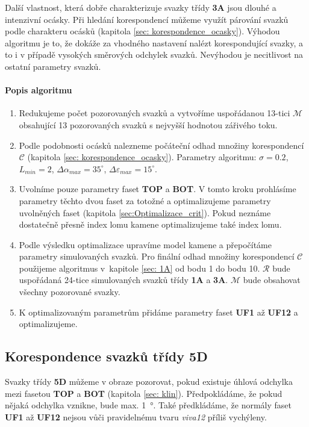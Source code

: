 	Další vlastnost, která dobře charakterizuje svazky třídy \textbf{3A} jsou dlouhé a intenzivní ocásky. Při hledání korespondencí můžeme využít párování svazků podle charakteru ocásků (kapitola \ref{sec: korespondence_ocasky}). Výhodou algoritmu je to, že dokáže za vhodného nastavení nalézt korespondující svazky, a to i v případě vysokých směrových odchylek svazků. Nevýhodou je necitlivost na ostatní parametry svazků. 

\paragraph{Popis algoritmu} 

\begin{enumerate}
	\item Redukujeme počet pozorovaných svazků a vytvoříme uspořádanou 13-tici $\mathcal{M}$ obsahující 13 pozorovaných svazků s nejvyšší hodnotou zářivého toku.  

	\item Podle podobnosti ocásků nalezneme počáteční odhad množiny korespondencí $\mathcal{C}$ (kapitola \ref{sec: korespondence_ocasky}). Parametry algoritmu: $\sigma = 0.2$, $L_{min} = 2$, $\Delta\alpha_{max} = 35^\circ$, $\Delta\varepsilon_{max} = 15^\circ$.
	
	\item Uvolníme pouze parametry faset \textbf{TOP} a \textbf{BOT}. V tomto kroku prohlásíme parametry těchto dvou faset za totožné a optimalizujeme parametry uvolněných faset (kapitola \ref{sec:Optimalizace_crit}). Pokud neznáme dostatečně přesně index lomu kamene optimalizujeme také index lomu. 
	
	\item Podle výsledku optimalizace upravíme model kamene a přepočítáme parametry simulovaných svazků. Pro finální odhad množiny korespondencí $\mathcal{C}$ použijeme algoritmus v~kapitole \ref{sec: 1A} od bodu 1 do bodu 10. $\mathcal{R}$ bude uspořádaná 24-tice simulovaných svazků třídy \textbf{1A} a \textbf{3A}. $\mathcal{M}$ bude obsahovat všechny pozorované svazky.  
	
	\item K optimalizovaným parametrům přidáme parametry faset \textbf{UF1} až \textbf{UF12} a optimalizujeme. 
		
\end{enumerate}

\newpage
\subsection{Korespondence svazků třídy \textbf{5D}}
\label{sec:5D}
	Svazky třídy \textbf{5D} můžeme v obraze pozorovat, pokud existuje úhlová odchylka mezi fasetou \textbf{TOP} a \textbf{BOT} (kapitola \ref{sec: klin}). Předpokládáme, že pokud nějaká odchylka vznikne, bude max. \SI{1}{\degree}. Také předkládáme, že normály faset \textbf{UF1} až \textbf{UF12} nejsou vůči pravidelnému tvaru \textit{viva12} příliš vychýleny.
	
